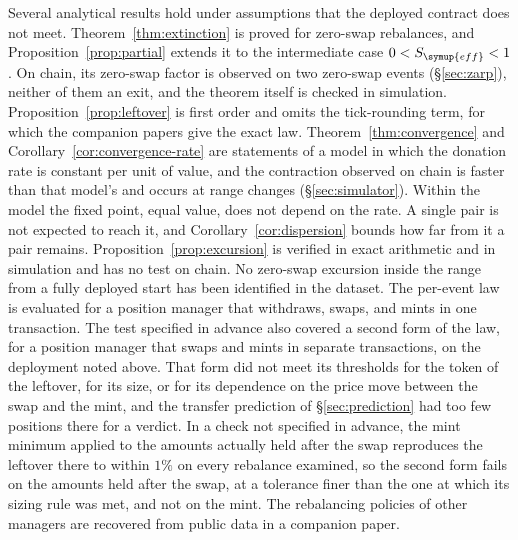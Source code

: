 \documentclass[11pt,a4paper]{article}
\theoremstyle{siphon}
\begin{document}
Several analytical results hold under assumptions that the deployed contract does not meet. Theorem~\ref{thm:extinction} is proved for zero-swap rebalances, and Proposition~\ref{prop:partial} extends it to the intermediate case $0 < S_{\symup{eff}} < 1$. On chain, its zero-swap factor is observed on two zero-swap events (\S\ref{sec:zarp}), neither of them an exit, and the theorem itself is checked in simulation. Proposition~\ref{prop:leftover} is first order and omits the tick-rounding term, for which the companion papers give the exact law. Theorem~\ref{thm:convergence} and Corollary~\ref{cor:convergence-rate} are statements of a model in which the donation rate is constant per unit of value, and the contraction observed on chain is faster than that model's and occurs at range changes (\S\ref{sec:simulator}). Within the model the fixed point, equal value, does not depend on the rate. A single pair is not expected to reach it, and Corollary~\ref{cor:dispersion} bounds how far from it a pair remains. Proposition~\ref{prop:excursion} is verified in exact arithmetic and in simulation and has no test on chain. No zero-swap excursion inside the range from a fully deployed start has been identified in the dataset. The per-event law is evaluated for a position manager that withdraws, swaps, and mints in one transaction. The test specified in advance also covered a second form of the law, for a position manager that swaps and mints in separate transactions, on the deployment noted above. That form did not meet its thresholds for the token of the leftover, for its size, or for its dependence on the price move between the swap and the mint, and the transfer prediction of \S\ref{sec:prediction} had too few positions there for a verdict. In a check not specified in advance, the mint minimum applied to the amounts actually held after the swap reproduces the leftover there to within $1\%$ on every rebalance examined, so the second form fails on the amounts held after the swap, at a tolerance finer than the one at which its sizing rule was met, and not on the mint. The rebalancing policies of other managers are recovered from public data in a companion paper.\cite{ryan2026of}
\end{document}
